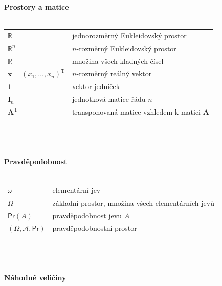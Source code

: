 \documentclass[a4paper,12pt]{report}
\theoremstyle{definition} \newtheorem{definice}[veta]{Definice}
\theoremstyle{remark}
\begin{document}
\normalsize
\textbf{Prostory a matice}\\\\
   \begin{tabular}{p{4cm} p{9.3cm}}
   $\mathbb{R}$                              &   jednorozměrný Eukleidovský prostor \\
   $\mathbb{R}^n$                              &     $n$-rozměrný Eukleidovský prostor \\
   $\mathbb{R}^+$                              &     množina všech kladných čísel \\
   $\boldsymbol{x}=(x_1,\ldots,x_n)^\mathrm{T}$             &    $n$-rozměrný reálný vektor \\
    $\boldsymbol{1}$                           &   vektor jedniček\\
   $\mathbf{I}_n$                              &    jednotková matice řádu $n$ \\
   $\mathbf{A}^\mathrm{T}$                              &   transponovaná matice vzhledem k matici $\mathbf{A}$\\
   \end{tabular}\\\\\\
%
%
\textbf{Pravděpodobnost}\\\\
   \begin{tabular}{p{4cm} p{9.3cm}}
   $\omega$				        & elementární jev\\
   $\Omega$                                          &   základní prostor, množina všech elementárních jevů \\
   $\mathsf{Pr}(A)$                               &  pravděpodobnost jevu $A$ \\
   $(\Omega,\mathcal{A}, \mathsf{Pr})$                         &   pravděpodobnostní prostor \\
   \end{tabular}\\\\\\
%
%
%
\textbf{Náhodné veličiny}\\\\
\end{document}
